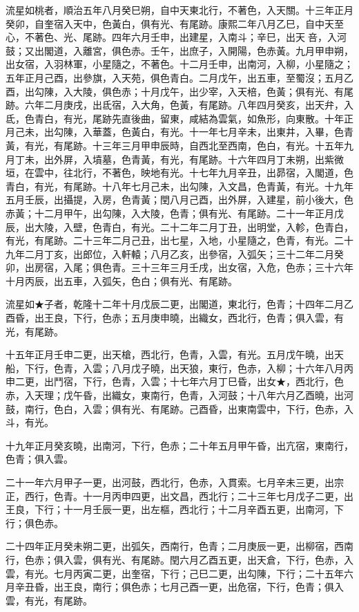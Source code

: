 \begin{pinyinscope}
流星如桃者，順治五年八月癸巳朔，自中天東北行，不著色，入天關。十三年正月癸卯，自奎宿入天中，色黃白，俱有光、有尾跡。康熙二年八月乙巳，自中天至心，不著色、光、尾跡。四年六月壬申，出建星，入南斗；辛巳，出天咅，入河鼓；又出閣道，入離宮，俱色赤。壬午，出庶子，入開陽，色赤黃。九月甲申朔，出女宿，入羽林軍，小星隨之，不著色。十二月壬申，出南河，入柳，小星隨之；五年正月己酉，出參旗，入天苑，俱色青白。二月戊午，出五車，至蜀沒；五月乙酉，出勾陳，入大陵，俱色赤；十月戊午，出少宰，入天棓，色黃；俱有光、有尾跡。六年二月庚戌，出氐宿，入大角，色黃，有尾跡。八年四月癸亥，出天弁，入氐，色青白，有光，尾跡先直後曲，留東，咸結為雲氣，如魚形，向東散。十年正月己未，出勾陳，入華蓋，色黃白，有光。十一年七月辛未，出東井，入畢，色青黃，有光，有尾跡。十三年三月甲申辰時，自西北至西南，色白，有光。十五年九月丁未，出外屏，入墳墓，色青黃，有光，有尾跡。十六年四月丁未朔，出紫微垣，在雲中，往北行，不著色，映地有光。十七年九月辛丑，出昴宿，入閣道，色青白，有光，有尾跡。十八年七月己未，出勾陳，入文昌，色青黃，有光。十九年五月壬辰，出攝提，入房，色青黃；閏八月己酉，出外屏，入建星，前小後大，色赤黃；十二月甲午，出勾陳，入大陵，色青；俱有光、有尾跡。二十一年正月戊辰，出大陵，入壁，色青白，有光。二十二年二月丁丑，出明堂，入軫，色青白，有光，有尾跡。二十三年二月己丑，出七星，入地，小星隨之，色青，有光。二十九年二月丁亥，出郎位，入軒轅；八月乙亥，出參宿，入弧矢；三十二年二月癸卯，出房宿，入尾；俱色青。三十三年三月壬戌，出女宿，入危，色赤；三十六年十月丙辰，出五車，入弧矢，色白；俱有光、有尾跡。

流星如★子者，乾隆十二年十月戊辰二更，出閣道，東北行，色青；十四年二月乙酉昏，出王良，下行，色赤；五月庚申曉，出織女，西北行，色青；俱入雲，有光，有尾跡。

十五年正月壬申二更，出天槍，西北行，色青，入雲，有光。五月戊午曉，出天船，下行，色青，入雲；八月戊子曉，出天狼，東行，色赤，入柳；十六年八月丙申二更，出鬥宿，下行，色青，入雲；十七年六月丁巳昏，出女★，西北行，色赤，入天理；戊午昏，出織女，東南行，色青，入河鼓；十八年六月乙酉曉，出河鼓，南行，色白，入雲；俱有光、有尾跡。己酉昏，出東南雲中，下行，色赤，入斗，有光。

十九年正月癸亥曉，出南河，下行，色赤；二十年五月甲午昏，出亢宿，東南行，色青；俱入雲。

二十一年六月甲子一更，出河鼓，西北行，色赤，入貫索。七月辛未三更，出宗正，西行，色青。十一月丙申四更，出文昌，西北行；二十三年七月戊子二更，出王良，下行；十一月壬辰一更，出左樞，西北行；十二月辛酉五更，出南河，下行；俱色赤。

二十四年正月癸未朔二更，出弧矢，西南行，色青；二月庚辰一更，出柳宿，西南行，色赤；俱入雲，俱有光、有尾跡。閏六月乙酉五更，出天倉，下行，色赤，入雲，有光。七月丙寅二更，出奎宿，下行；己巳二更，出勾陳，下行；二十五年六月辛丑昏，出王良，南行；俱色赤；七月己酉一更，出危宿，下行，色青；俱入雲，有光，有尾跡。


\end{pinyinscope}
